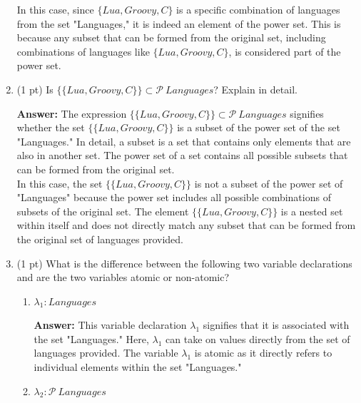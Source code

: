 \documentclass[12pt]{article}
\begin{document}
\begin{spacing}{1.5}
\begin{enumerate}
		      In this case, since $\{Lua, Groovy, C\}$ is a specific combination of languages from the set "Languages," it is indeed an element of the power set. This is because any subset that can be formed from the original set, including combinations of languages like $\{Lua, Groovy, C\}$, is considered part of the power set.\\
		      		      		                  
		\item (1 pt) Is $\{\{Lua, Groovy, C\}\} \subset \mathcal{P} \: Languages$? Explain in detail.
		      		      		      
		      \textbf{Answer:}  The expression $\{\{Lua, Groovy, C\}\} \subset \mathcal{P} \: Languages$ signifies whether the set $\{\{Lua, Groovy, C\}\}$ is a subset of the power set of the set "Languages." In detail, a subset is a set that contains only elements that are also in another set. The power set of a set contains all possible subsets that can be formed from the original set.\\
		      		      		                  
		      In this case, the set $\{\{Lua, Groovy, C\}\}$ is not a subset of the power set of "Languages" because the power set includes all possible combinations of subsets of the original set. The element $\{\{Lua, Groovy, C\}\}$ is a nested set within itself and does not directly match any subset that can be formed from the original set of languages provided.\\
		      		      		                  
		\item (1 pt) What is the difference between the following two variable declarations and are the two variables atomic or non-atomic?
		      		      		                  
		      \begin{enumerate}
		      	\item $\lambda_1 : Languages$
		      	      		      	      		      	      
		      	      \textbf{Answer:} This variable declaration $\lambda_1$ signifies that it is associated with the set "Languages." Here, $\lambda_1$ can take on values directly from the set of languages provided. The variable $\lambda_1$ is atomic as it directly refers to individual elements within the set "Languages."\\
		      	      		      	      		      	                  
		      	\item $\lambda_2 : \mathcal{P} \: Languages$
		      	      		      	      		      	          

\end{enumerate}
\end{enumerate}
\end{spacing}
\end{document}
